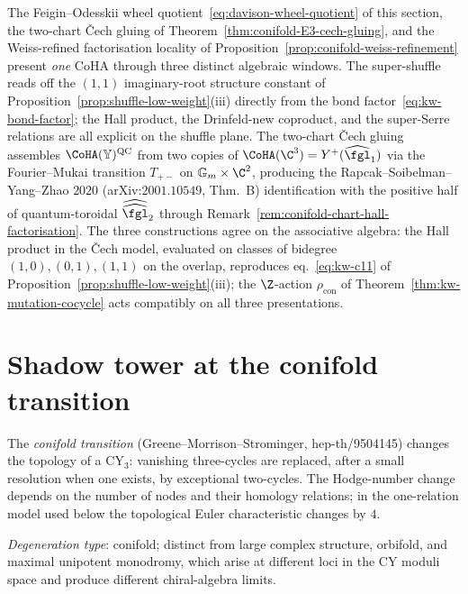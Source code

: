 \begin{remark}
\label{rem:kw-three-windows}
The Feigin--Odesskii wheel quotient~\eqref{eq:davison-wheel-quotient} of this section, the two-chart \v{C}ech gluing of Theorem~\ref{thm:conifold-E3-cech-gluing}, and the Weiss-refined factorisation locality of Proposition~\ref{prop:conifold-weiss-refinement} present \emph{one} CoHA through three distinct algebraic windows. The super-shuffle reads off the $(1,1)$ imaginary-root structure constant of Proposition~\ref{prop:shuffle-low-weight}\textup{(iii)} directly from the bond factor~\eqref{eq:kw-bond-factor}; the Hall product, the Drinfeld-new coproduct, and the super-Serre relations are all explicit on the shuffle plane. The two-chart \v{C}ech gluing assembles $\CoHA(\bY)^{\mathrm{QC}}$ from two copies of $\CoHA(\C^3) = Y^+(\widehat{\fgl}_1)$ via the Fourier--Mukai transition $T_{+-}$ on $\Gm \times \C^2$, producing the Rapcak--Soibelman--Yang--Zhao $2020$ (arXiv:$2001.10549$, Thm.~B) identification with the positive half of quantum-toroidal $\widehat{\widehat{\fgl}}_2$ through Remark~\ref{rem:conifold-chart-hall-factorisation}. The three constructions agree on the associative algebra: the Hall product in the \v{C}ech model, evaluated on classes of bidegree $(1,0), (0,1), (1,1)$ on the overlap, reproduces eq.~\eqref{eq:kw-c11} of Proposition~\ref{prop:shuffle-low-weight}\textup{(iii)}; the $\Z$-action $\rho_{\mathrm{con}}$ of Theorem~\ref{thm:kw-mutation-cocycle} acts compatibly on all three presentations.
\end{remark}


\section{Shadow tower at the conifold transition}
\label{sec:conifold-shadow-transition}

The \emph{conifold transition} (Greene--Morrison--Strominger, hep-th/9504145) changes the topology of a CY$_3$: vanishing three-cycles are replaced, after a small resolution when one exists, by exceptional two-cycles. The Hodge-number change depends on the number of nodes and their homology relations; in the one-relation model used below the topological Euler characteristic changes by \(4\).

\medskip
\noindent\textit{Degeneration type}: conifold; distinct from large complex structure, orbifold, and maximal unipotent monodromy, which arise at different loci in the CY moduli space and produce different chiral-algebra limits.

